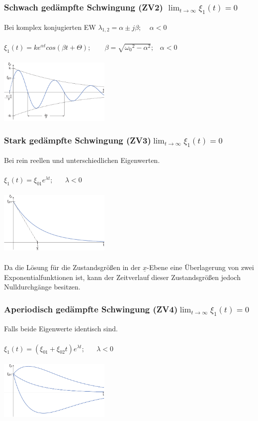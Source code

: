 \documentclass[a4paper,twocolumn,10pt]{article}
\begin{document}
\subsubsection*{Schwach gedämpfte Schwingung (ZV2) $\lim_{t \to \infty} \xi_1(t)=0$}
Bei komplex konjugierten EW $\lambda_{1,2}=\alpha\pm j\beta;\;\;\;\;\alpha<0$\\\\
$\xi_1(t)=ke^{\alpha t}cos(\beta t+\Theta);\;\;\;\;\;\;\;\beta =\sqrt{{\omega_0}^2-\alpha^2};\;\;\;\alpha<0$\\\\
\includegraphics[width=0.4\textwidth]{img/Zustandsvariablen_Zeitverlauf2}

\subsubsection*{Stark gedämpfte Schwingung (ZV3)$\lim_{t \to \infty} \xi_1(t)=0$}
Bei rein reellen und unterschiedlichen Eigenwerten.\\\\
$\xi_1(t)=\xi_{01}e^{\lambda t};\;\;\;\;\;\;\lambda<0$\\\\
\includegraphics[width=0.4\textwidth]{img/Zustandsvariablen_Zeitverlauf3}\\\\
Da die Lösung für die Zustandsgrößen in der $\underline{x}$-Ebene eine Überlagerung von zwei Exponentialfunktionen ist, kann der Zeitverlauf dieser Zustandsgrößen jedoch Nulldurchgänge besitzen.

\subsubsection*{Aperiodisch gedämpfte Schwingung (ZV4)$\lim_{t \to \infty} \xi_1(t)=0$}
Falls beide Eigenwerte identisch sind.\\\\
$\xi_1(t)=(\xi_{01}+\xi_{02}t)e^{\lambda t};\;\;\;\;\;\;\lambda<0$\\\\
\includegraphics[width=0.4\textwidth]{img/Zustandsvariablen_Zeitverlauf4}\\\\
\end{document}
